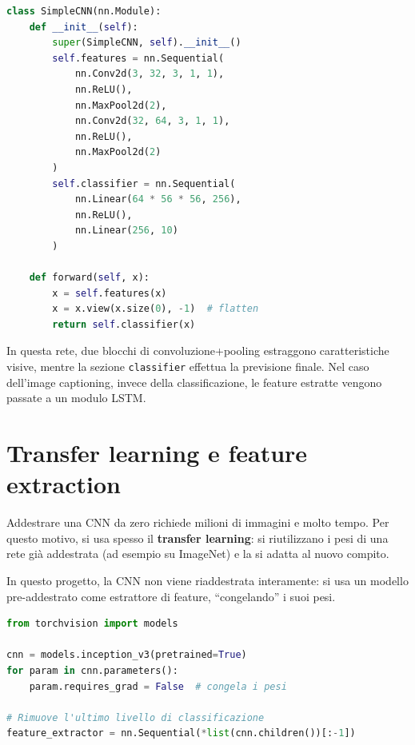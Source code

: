 \documentclass[11pt,a4paper]{report}
\begin{document}
\begin{lstlisting}[language=Python, caption={Esempio di CNN semplificata.}]
class SimpleCNN(nn.Module):
    def __init__(self):
        super(SimpleCNN, self).__init__()
        self.features = nn.Sequential(
            nn.Conv2d(3, 32, 3, 1, 1),
            nn.ReLU(),
            nn.MaxPool2d(2),
            nn.Conv2d(32, 64, 3, 1, 1),
            nn.ReLU(),
            nn.MaxPool2d(2)
        )
        self.classifier = nn.Sequential(
            nn.Linear(64 * 56 * 56, 256),
            nn.ReLU(),
            nn.Linear(256, 10)
        )

    def forward(self, x):
        x = self.features(x)
        x = x.view(x.size(0), -1)  # flatten
        return self.classifier(x)
\end{lstlisting}

\begin{tcolorbox}[title=Nota]
In questa rete, due blocchi di convoluzione+pooling estraggono caratteristiche visive, mentre la sezione \texttt{classifier} effettua la previsione finale.  
Nel caso dell’image captioning, invece della classificazione, le feature estratte vengono passate a un modulo LSTM.
\end{tcolorbox}

\section{Transfer learning e feature extraction}

Addestrare una CNN da zero richiede milioni di immagini e molto tempo.  
Per questo motivo, si usa spesso il \textbf{transfer learning}: si riutilizzano i pesi di una rete già addestrata (ad esempio su ImageNet) e la si adatta al nuovo compito.

In questo progetto, la CNN non viene riaddestrata interamente: si usa un modello pre-addestrato come estrattore di feature, “congelando” i suoi pesi.

\begin{lstlisting}[language=Python, caption={Uso di InceptionV3 come estrattore di feature.}]
from torchvision import models

cnn = models.inception_v3(pretrained=True)
for param in cnn.parameters():
    param.requires_grad = False  # congela i pesi

# Rimuove l'ultimo livello di classificazione
feature_extractor = nn.Sequential(*list(cnn.children())[:-1])
\end{lstlisting}
\end{document}
